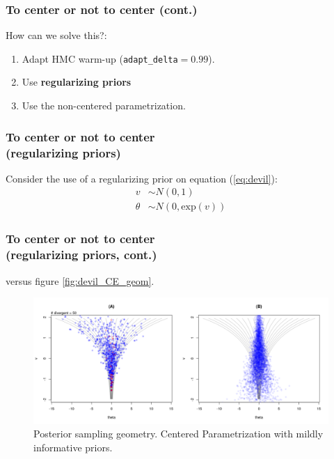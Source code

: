 \documentclass[arial,12pt,xcolor=dvipsnames]{beamer}
\begin{document}
%
\begin{frame}
	\frametitle{To center or not to center (cont.)}
	How can we solve this?:
	\begin{enumerate}
		\item Adapt HMC warm-up (\texttt{adapt\_delta}$=0.99$).
		\item Use \textbf{regularizing priors}
		\item Use the non-centered parametrization.
	\end{enumerate}
\end{frame}
%
\begin{frame}
	\frametitle{To center or not to center \\
		(regularizing priors)}
	Consider the use of a regularizing prior on equation (\ref{eq:devil}): 
	\begin{equation} \label{eq:devil_prior}
		\begin{split}	
			v &\sim N(0, 1) \\
			\theta &\sim N(0, \text{exp}(v))
		\end{split}
	\end{equation}
\end{frame}
%
\begin{frame}
	\frametitle{To center or not to center \\
		(regularizing priors, cont.)}
	versus figure \ref{fig:devil_CE_geom}.
	\begin{figure}[!h]
		\centering
		\includegraphics[width=1\linewidth]{2_funnel_CE_priors}
		\caption{Posterior sampling geometry. Centered Parametrization with mildly informative priors.}
		\label{fig:devil_prior_geom}
	\end{figure}
\end{frame}
%
\end{document}
